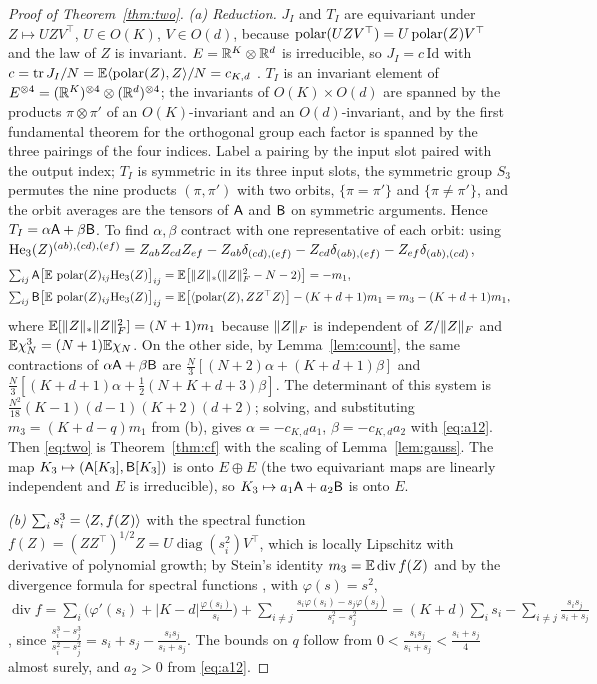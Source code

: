 \begin{proof}[Proof of Theorem~\ref{thm:two}]
\emph{(a) Reduction.} $J_I$ and $T_I$ are equivariant under $Z\mapsto UZV^\top$, $U\in O(K)$, $V\in O(d)$, because
$\operatorname{polar}(UZV^\top)=U\operatorname{polar}(Z)V^\top$ and the law of $Z$ is invariant. $E=\mathbb{R}^K\otimes\mathbb{R}^d$ is irreducible, so
$J_I=c\,\mathrm{Id}$ with $c=\operatorname{tr} J_I/N=\mathbb{E}\langle \operatorname{polar}(Z), Z\rangle/N=c_{K,d}$ \citep{xie2026muon,chen2026when}. $T_I$ is an invariant element of
$E^{\otimes4}=(\mathbb{R}^K)^{\otimes4}\otimes(\mathbb{R}^d)^{\otimes4}$; the invariants of $O(K)\times O(d)$ are spanned by the
products $\pi\otimes\pi'$ of an $O(K)$-invariant and an $O(d)$-invariant, and by the first fundamental theorem for the
orthogonal group each factor is spanned by the three pairings of the four indices. Label a pairing by the input slot
paired with the output index; $T_I$ is symmetric in its three input slots, the symmetric group $S_3$ permutes the nine
products $(\pi,\pi')$ with two orbits, $\{\pi=\pi'\}$ and $\{\pi\ne\pi'\}$, and the orbit averages are the tensors of
$\mathsf{A}$ and $\mathsf{B}$ on symmetric arguments. Hence $T_I=\alpha\mathsf{A}+\beta\mathsf{B}$. To find $\alpha,\beta$ contract with one representative of each orbit:
using $\mathrm{He}_3(Z)^{(ab),(cd),(ef)}=Z_{ab}Z_{cd}Z_{ef}-Z_{ab}\delta_{(cd),(ef)}-Z_{cd}\delta_{(ab),(ef)}-Z_{ef}\delta_{(ab),(cd)}$,
\begin{align*}
\textstyle\sum_{ij}\mathsf{A}\big[\mathbb{E}\,\operatorname{polar}(Z)_{ij}\mathrm{He}_3(Z)\big]_{ij}&=\mathbb{E}\big[\|Z\|_{*}(\|Z\|_{F}^2-N-2)\big]=-m_1,\\
\textstyle\sum_{ij}\mathsf{B}\big[\mathbb{E}\,\operatorname{polar}(Z)_{ij}\mathrm{He}_3(Z)\big]_{ij}&=\mathbb{E}\big[\langle \operatorname{polar}(Z), ZZ^\top Z\rangle\big]-(K+d+1)m_1=m_3-(K+d+1)m_1,
\end{align*}
where $\mathbb{E}[\|Z\|_{*}\|Z\|_{F}^2]=(N+1)m_1$ because $\|Z\|_{F}$ is independent of $Z/\|Z\|_{F}$ and $\mathbb{E}\chi_N^3=(N+1)\mathbb{E}\chi_N$. On the
other side, by Lemma~\ref{lem:count}, the same contractions of $\alpha\mathsf{A}+\beta\mathsf{B}$ are
$\frac N3[(N+2)\alpha+(K+d+1)\beta]$ and $\frac N3[(K+d+1)\alpha+\frac12(N+K+d+3)\beta]$. The determinant of this system
is $\frac{N^2}{18}(K-1)(d-1)(K+2)(d+2)$; solving, and substituting $m_3=(K+d-q)m_1$ from (b), gives
$\alpha=-c_{K,d}a_1$, $\beta=-c_{K,d}a_2$ with \eqref{eq:a12}. Then \eqref{eq:two} is Theorem~\ref{thm:cf} with the scaling
of Lemma~\ref{lem:gauss}. The map $K_3\mapsto(\mathsf{A}[K_3],\mathsf{B}[K_3])$ is onto $E\oplus E$ (the two equivariant maps are
linearly independent and $E$ is irreducible), so $K_3\mapsto a_1\mathsf{A}+a_2\mathsf{B}$ is onto $E$.

\emph{(b)} $\sum_is_i^3=\langle Z, f(Z)\rangle$ with the spectral function $f(Z)=(ZZ^\top)^{1/2}Z=U\operatorname{diag}(s_i^2)V^\top$,
which is locally Lipschitz with derivative of polynomial growth; by Stein's identity $m_3=\mathbb{E}\operatorname{div}f(Z)$ and by the divergence formula for spectral functions
\citep{candes}, with $\varphi(s)=s^2$,
$\operatorname{div}f=\sum_i\big(\varphi'(s_i)+|K-d|\frac{\varphi(s_i)}{s_i}\big)+\sum_{i\ne j}\frac{s_i\varphi(s_i)-s_j\varphi(s_j)}{s_i^2-s_j^2}
=(K+d)\sum_is_i-\sum_{i\ne j}\frac{s_is_j}{s_i+s_j}$, since
$\frac{s_i^3-s_j^3}{s_i^2-s_j^2}=s_i+s_j-\frac{s_is_j}{s_i+s_j}$. The bounds on $q$ follow from
$0<\frac{s_is_j}{s_i+s_j}<\frac{s_i+s_j}4$ almost surely, and $a_2>0$ from \eqref{eq:a12}.


\end{proof}
